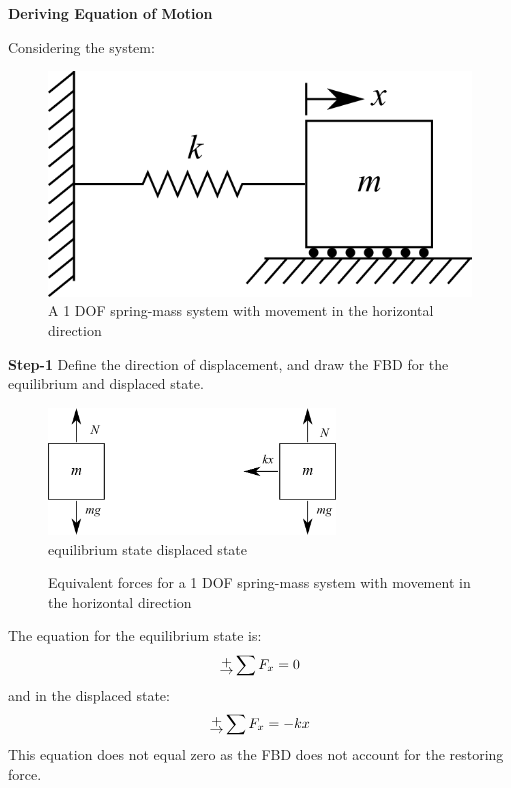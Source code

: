 \documentclass[12pt,letter]{article}
\begin{document}
					
		\begin{example}			
			

			\textbf{Deriving Equation of Motion}

			\noindent Considering the system:
			\begin{figure}[H]
				\centering
				\includegraphics[]{../figures/1-DOF-spring_mass_horizontal.png}
				\caption{A 1 DOF spring-mass system with movement in the horizontal direction}
			\end{figure}		
			
			\noindent \textbf{Step-1}
			Define the direction of displacement, and draw the FBD for the equilibrium and displaced state.  
			\begin{figure}[H]
				\centering
				\includegraphics[width=3in]{../figures/1-DOF-mass_horizontal_FBD}\\
				equilibrium state \hspace{3cm} displaced state
				\caption{Equivalent forces for a 1 DOF spring-mass system with movement in the horizontal direction}
			\end{figure}		
			\noindent The equation for the equilibrium state is:
			\begin{equation}
			\rightplus \sum F_x = 0
			\end{equation}
			and in the displaced state:
			\begin{equation}
			\rightplus \sum F_x = -kx
			\end{equation}		
			This equation does not equal zero as the FBD does not account for the restoring force. 
	

\end{example}
\end{document}
